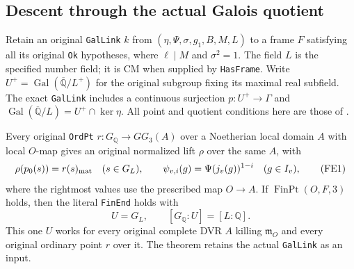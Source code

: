 \subsection{Descent through the actual Galois quotient}
\label{sec:support-finite-end}

Retain an original \texttt{GalLink} $k$ from
$(\eta,\Psi,\sigma,g_1,B,M,L)$ to a frame $F$ satisfying all its
original \texttt{Ok} hypotheses, where $\ell\mid M$ and $\sigma^2=1$.
The field $L$ is the specified number field; it is CM when supplied
by \texttt{HasFrame}.  Write $U^+=\operatorname{Gal}(\overline{\mathbb Q}/L^+)$
for the original subgroup fixing its maximal real subfield.
The exact \texttt{GalLink} includes a continuous surjection
$p:U^+\to\Gamma$ and
$\operatorname{Gal}(\overline{\mathbb Q}/L)=U^+\cap\ker\eta$.
All point and quotient conditions here are those of
\cite{support-finite-end-source}.

\begin{theorem}
\label{thm:support-finite-end}
Every original \texttt{OrdPt} $r:G_{\mathbb Q}\to GG_3(A)$ over
a Noetherian local domain $A$ with local $O$-map gives an original
normalized lift $\rho$ over the same $A$, with
\[
 \rho(p_0(s))=r(s)_{\rm mat}\quad(s\in G_L),\qquad
 \psi_{v,i}(g)=\Psi(j_v(g))^{1-i}\quad(g\in I_v),            \tag{FE1}
\]
where the rightmost values use the prescribed map $O\to A$.
If $\operatorname{FinPt}(O,F,3)$ holds, then the literal
\texttt{FinEnd} holds with
\[
 U=G_L,\qquad [G_{\mathbb Q}:U]=[L:\mathbb Q].              \tag{FE2}
\]
This one $U$ works for every original complete DVR $A$ killing
$\mathfrak m_O$ and every original ordinary point $r$ over it.
The theorem retains the actual \texttt{GalLink} as an input.
\end{theorem}

